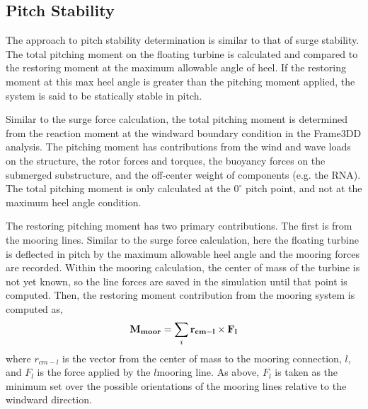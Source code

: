 \subsection{Pitch Stability}
The approach to pitch stability determination is similar to that of
surge stability.  The total pitching moment on the floating turbine is
calculated and compared to the restoring moment at the maximum allowable
angle of heel.  If the restoring moment at this max heel angle is
greater than the pitching moment applied, the system is said to be
statically stable in pitch.

Similar to the surge force calculation, the total pitching moment is
determined from the reaction moment at the windward boundary condition
in the Frame3DD analysis.  The pitching moment has contributions from
the wind and wave loads on the structure, the rotor forces and torques,
the buoyancy forces on the submerged substructure, and the off-center
weight of components (e.g. the RNA).  The total pitching moment is only
calculated at the $0^{\circ}$ pitch point, and not at the maximum heel
angle condition.

The restoring pitching moment has two primary contributions.  The first
is from the mooring lines.  Similar to the surge force calculation, here
the floating turbine is deflected in pitch by the maximum allowable heel
angle and the mooring forces are recorded.  Within the mooring
calculation, the center of mass of the turbine is not yet known, so the line
forces are saved in the simulation until that point is computed.  Then,
the restoring moment contribution from the mooring system is computed as,
\[
  \mathbf{M_{moor}} = \sum_i \mathbf{r_{cm-l}} \times \mathbf{F_l}
\]
where $r_{cm-l}$ is the vector from the center of mass to the mooring
connection, $l$, and $F_l$ is the force applied by the $l$\th mooring
line.  As above, $F_l$ is taken as the minimum set over the possible
orientations of the mooring lines relative to the windward direction.

